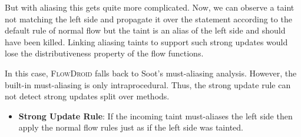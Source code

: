 \documentclass[../draft.tex]{subfiles}
\begin{document}
    But with aliasing this gets quite more complicated. Now, we can observe a taint not matching the left side and propagate it over the statement according to the default rule of normal flow but the taint is an alias of the left side and should have been killed. Linking aliasing taints to support such strong updates would lose the distributiveness property of the flow functions. 
    
    In this case, \textsc{FlowDroid} falls back to Soot's must-aliasing analysis. However, the built-in must-aliasing is only intraprocedural. Thus, the strong update rule can not detect strong updates split over methods.

    \begin{itemize}
        \item \textbf{Strong Update Rule}: If the incoming taint must-aliases the left side then apply the normal flow rules just as if the left side was tainted. 
    \end{itemize}
\end{document}
